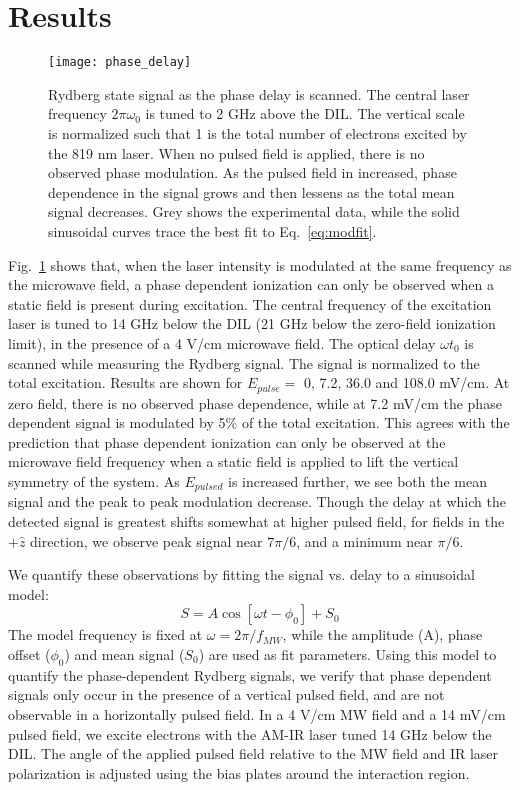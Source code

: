 \documentclass[aps,pra,preprint,groupedaddress]{revtex4-1}
\begin{document}
\section{\label{results} Results}

\begin{figure}
	\texttt{[image: phase\_delay]}
	\caption{Rydberg state signal as the phase delay is scanned. The central laser frequency $2\pi\omega_0$ is tuned to 2 GHz above the DIL. The vertical scale is normalized such that 1 is the total number of electrons excited by the 819 nm laser. When no pulsed field is applied, there is no observed phase modulation. As the pulsed field in increased,  phase dependence in the signal grows and then lessens as the total mean signal decreases. Grey shows the experimental data, while the solid sinusoidal curves trace the best fit to Eq.~\ref{eq:modfit}.}
	\label{fig:phase_delay}
\end{figure}

Fig.~\ref{fig:phase_delay} shows that, when the laser intensity is modulated at the same frequency as the microwave field, a phase dependent ionization can only be observed when a static field is present during excitation. The central frequency of the excitation laser is tuned to 14 GHz below the DIL (21 GHz below the zero-field ionization limit), in the presence of a 4 V/cm microwave field. The optical delay $\omega t_0$ is scanned while measuring the Rydberg signal. The signal is normalized to the total excitation. Results are shown for $E_{pulse} =$ 0, 7.2, 36.0 and 108.0 mV/cm. At zero field, there is no observed phase dependence, while at 7.2 mV/cm the phase dependent signal is modulated by 5\% of the total excitation. This agrees with the prediction that phase dependent ionization can only be observed at the microwave field frequency when a static field is applied to lift the vertical symmetry of the system. As $E_{pulsed}$ is increased further, we see both the mean signal and the peak to peak modulation decrease. Though the delay at which the detected signal is greatest shifts somewhat at higher pulsed field, for fields in the $+\hat{z}$ direction, we observe peak signal near $7\pi/6$, and a minimum near $\pi/6$.

We quantify these observations by fitting the signal vs. delay to a sinusoidal model:
\begin{equation} \label{eq:modfit}
S = A \cos{[\omega t - \phi_0]} + S_0
\end{equation}
The model frequency is fixed at $\omega = 2\pi / f_{MW}$, while the amplitude (A), phase offset ($\phi_0$) and mean signal ($S_0$) are used as fit parameters. Using this model to quantify the phase-dependent Rydberg signals, we verify that phase dependent signals only occur in the presence of a vertical pulsed field, and are not observable in a horizontally pulsed field. In a 4 V/cm MW field and a 14 mV/cm pulsed field, we excite electrons with the AM-IR laser tuned 14 GHz below the DIL. The angle of the applied pulsed field relative to the MW field and IR laser polarization is adjusted using the bias plates around the interaction region.
\end{document}
